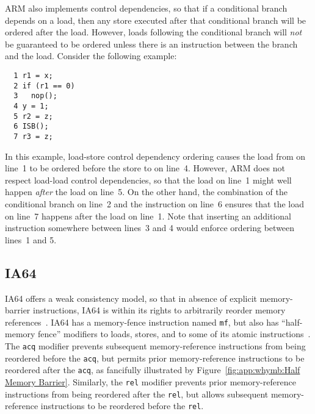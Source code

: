 ARM also implements control dependencies, so that if a conditional
branch depends on a load, then any store executed after that conditional
branch will be ordered after the load.
However, loads following the conditional branch will \emph{not}
be guaranteed to be ordered unless there is an 
instruction between the branch and the load.
Consider the following example:

\vspace{5pt}
\begin{minipage}[t]{\columnwidth}
\small
\begin{verbatim}
  1 r1 = x;
  2 if (r1 == 0)
  3   nop();
  4 y = 1;
  5 r2 = z;
  6 ISB();
  7 r3 = z;
\end{verbatim}
\end{minipage}
\vspace{5pt}

In this example, load-store control dependency ordering causes
the load from  on line~1 to be ordered before the store to
 on line~4.
However, ARM does not respect load-load control dependencies, so that
the load on line~1 might well happen \emph{after} the
load on line~5.
On the other hand, the combination of the conditional branch on line~2
and the  instruction on line~6 ensures that
the load on line~7 happens after the load on line~1.
Note that inserting an additional  instruction somewhere between
lines~3 and 4 would enforce ordering between lines~1 and 5.

\subsection{IA64}

IA64 offers a weak consistency model, so that in absence of explicit
memory-barrier instructions, IA64 is within its rights to arbitrarily
reorder memory references~\cite{IntelItanium02v2}.
IA64 has a memory-fence instruction named {\tt mf}, but also has
``half-memory fence'' modifiers to loads, stores, and to some of its atomic
instructions~\cite{IntelItanium02v3}.
The {\tt acq} modifier prevents subsequent memory-reference instructions
from being reordered before the {\tt acq}, but permits
prior memory-reference instructions to be reordered after the {\tt acq},
as fancifully illustrated by Figure~\ref{fig:app:whymb:Half Memory Barrier}.
Similarly, the {\tt rel} modifier prevents prior memory-reference
instructions from being reordered after the {\tt rel}, but allows
subsequent memory-reference instructions to be reordered before
the {\tt rel}.

